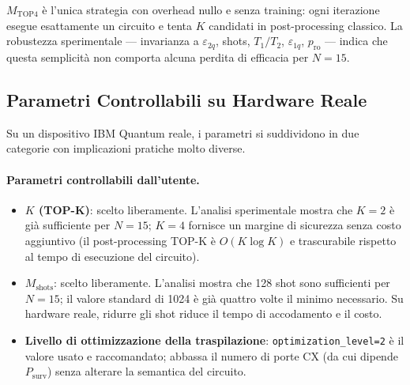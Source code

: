 \begin{onehalfspace}
$M_{\text{TOP4}}$ è l'unica strategia con overhead nullo e senza training: ogni iterazione esegue esattamente un circuito e tenta $K$ candidati in post-processing classico. La robustezza sperimentale — invarianza a $\varepsilon_{2q}$, shots, $T_1/T_2$, $\varepsilon_{1q}$, $p_{\text{ro}}$ — indica che questa semplicità non comporta alcuna perdita di efficacia per $N=15$.

\subsection{Parametri Controllabili su Hardware Reale}
\label{subsec:parametri_hardware}

Su un dispositivo IBM Quantum reale, i parametri si suddividono in due categorie con implicazioni pratiche molto diverse.

\paragraph{Parametri controllabili dall'utente.}
\begin{itemize}
    \item \textbf{$K$ (TOP-K)}: scelto liberamente. L'analisi sperimentale mostra che $K=2$ è già sufficiente per $N=15$; $K=4$ fornisce un margine di sicurezza senza costo aggiuntivo (il post-processing TOP-K è $O(K \log K)$ e trascurabile rispetto al tempo di esecuzione del circuito).
    \item \textbf{$M_{\text{shots}}$}: scelto liberamente. L'analisi mostra che 128 shot sono sufficienti per $N=15$; il valore standard di 1024 è già quattro volte il minimo necessario. Su hardware reale, ridurre gli shot riduce il tempo di accodamento e il costo.
    \item \textbf{Livello di ottimizzazione della traspilazione}: \texttt{optimization\_level=2} è il valore usato e raccomandato; abbassa il numero di porte CX (da cui dipende $P_{\text{surv}}$) senza alterare la semantica del circuito.
\end{itemize}


\end{onehalfspace}
